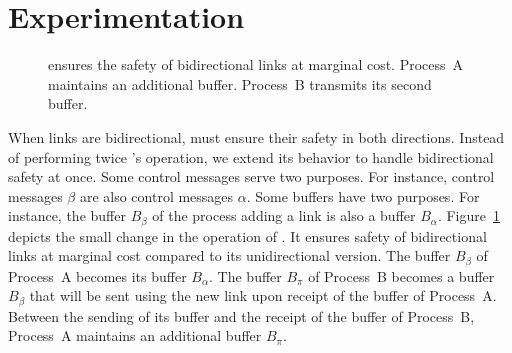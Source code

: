 
\section{Experimentation}
\label{sec:experimentation}

\begin{figure}
  \begin{center}
  
  \caption{\label{fig:bibroadcast}\RPCBROADCAST ensures the safety of bidirectional links
    at marginal cost. Process~A maintains an additional buffer. Process~B transmits its
    second buffer.}
  \end{center}
\end{figure}

When links are bidirectional, \RPCBROADCAST must ensure their safety in both
directions. Instead of performing twice \RPCBROADCAST's operation, we extend its
behavior to handle bidirectional safety at once. Some control messages serve two
purposes. For instance, control messages $\beta$ are also control messages
$\alpha$. Some buffers have two purposes. For instance, the buffer $B_\beta$ of
the process adding a link is also a buffer $B_\alpha$.
Figure~\ref{fig:bibroadcast} depicts the small change in the operation of
\RPCBROADCAST. It ensures safety of bidirectional links at marginal cost
compared to its unidirectional version. The buffer $B_\beta$ of Process~A
becomes its buffer $B_\alpha$. The buffer $B_\pi$ of Process~B becomes a buffer
$B_\beta$ that will be sent using the new link upon receipt of the buffer of
Process~A. Between the sending of its buffer and the receipt of the buffer of
Process~B, Process~A maintains an additional buffer $B_\pi$.

